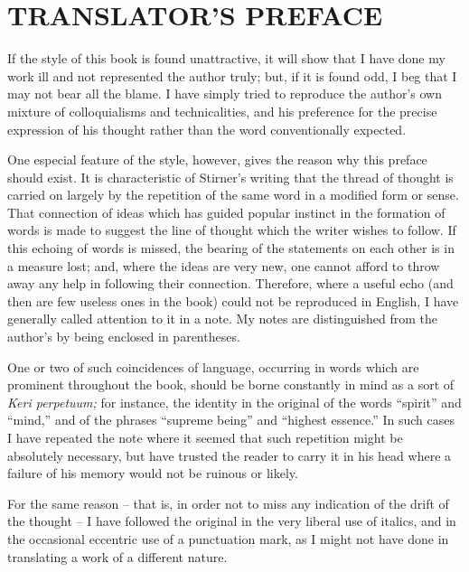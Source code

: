 
\chapter[Translator's Preface]{\centering TRANSLATOR'S PREFACE}

If the style of this book is found unattractive, it will show that I have done 
my work ill and not represented the author truly; but, if it is found odd, I 
beg that I may not bear all the blame. I have simply tried to reproduce the 
author's own mixture of colloquialisms and technicalities, and his preference 
for the precise expression of his thought rather than the word conventionally 
expected.

One especial feature of the style, however, gives the reason why this preface 
should exist. It is characteristic of Stirner's writing that the thread of 
thought is carried on largely by the repetition of the same word in a modified 
form or sense. That connection of ideas which has guided popular instinct in 
the formation of words is made to suggest the line of thought which the writer 
wishes to follow. If this echoing of words is missed, the bearing of the 
statements on each other is in a measure lost; and, where the ideas are very 
new, one cannot afford to throw away any help in following their connection. 
Therefore, where a useful echo (and then are few useless ones in the book) 
could not be reproduced in English, I have generally called attention to it in 
a note. My notes are distinguished from the author's by being enclosed in 
parentheses.

One or two of such coincidences of language, occurring in words which are 
prominent throughout the book, should be borne constantly in mind as a sort of 
\textit{Keri perpetuum;} for instance, the identity in the original of the 
words ``spirit'' and ``mind,'' and of the phrases ``supreme being'' and 
``highest essence.'' In such cases I have repeated the note where it seemed 
that such repetition might be absolutely necessary, but have trusted the 
reader to carry it in his head where a failure of his memory would not be 
ruinous or likely.

For the same reason -- that is, in order not to miss any indication of the drift 
of the thought -- I have followed the original in the very liberal use of 
italics, and in the occasional eccentric use of a punctuation mark, as I might 
not have done in translating a work of a different nature.

